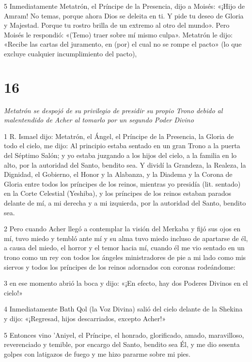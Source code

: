 \par 5 Inmediatamente Metatrón, el Príncipe de la Presencia, dijo a Moisés: «¡Hijo de Amram! No temas, porque ahora Dios se deleita en ti. Y pide tu deseo de Gloria y Majestad. Porque tu rostro brilla de un extremo al otro del mundo». Pero Moisés le respondió: «(Temo) traer sobre mí mismo culpa». Metatrón le dijo: «Recibe las cartas del juramento, en (por) el cual no se rompe el pacto» (lo que excluye cualquier incumplimiento del pacto),

\chapter{16}

\par \textit{Metatrón se despojó de su privilegio de presidir su propio Trono debido al malentendido de Acher al tomarlo por un segundo Poder Divino}

\par 1 R. Ismael dijo: Metatrón, el Ángel, el Príncipe de la Presencia, la Gloria de todo el cielo, me dijo: Al principio estaba sentado en un gran Trono a la puerta del Séptimo Salón; y yo estaba juzgando a los hijos del cielo, a la familia en lo alto, por la autoridad del Santo, bendito sea. Y dividí la Grandeza, la Realeza, la Dignidad, el Gobierno, el Honor y la Alabanza, y la Diadema y la Corona de Gloria entre todos los príncipes de los reinos, mientras yo presidía (lit. sentado) en la Corte Celestial (Yeshiba), y los príncipes de los reinos estaban parados delante de mí, a mi derecha y a mi izquierda, por la autoridad del Santo, bendito sea.

\par 2 Pero cuando Acher llegó a contemplar la visión del Merkaba y fijó sus ojos en mí, tuvo miedo y tembló ante mí y su alma tuvo miedo incluso de apartarse de él, a causa del miedo, el horror y el temor hacia mí, cuando él me vio sentado en un trono como un rey con todos los ángeles ministradores de pie a mi lado como mis siervos y todos los príncipes de los reinos adornados con coronas rodeándome:

\par 3 en ese momento abrió la boca y dijo: «¡En efecto, hay dos Poderes Divinos en el cielo!»

\par 4 Inmediatamente Bath Qol (la Voz Divina) salió del cielo delante de la Shekina y dijo: «¡Regresad, hijos descarriados, excepto Acher!»

\par 5 Entonces vino 'Aniyel, el Príncipe, el honrado, glorificado, amado, maravilloso, reverenciado y temible, por encargo del Santo, bendito sea Él, y me dio sesenta golpes con latigazos de fuego y me hizo pararme sobre mi pies.

